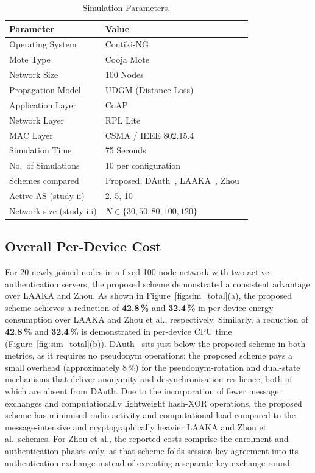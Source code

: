 \documentclass[12pt,a4paper]{report}
\begin{document}
\begin{table}[!ht]
  \centering
  \caption{Simulation Parameters.}
  \label{tab:simparams}
  \small
  \setlength{\tabcolsep}{5pt}
  \begin{tabular}{ll}
    \toprule
    Parameter & Value \\
    \midrule
    Operating System     & Contiki-NG \\
    Mote Type            & Cooja Mote \\
    Network Size         & 100 Nodes \\
    Propagation Model    & UDGM (Distance Loss) \\
    Application Layer    & CoAP \\
    Network Layer        & RPL Lite \\
    MAC Layer            & CSMA / IEEE 802.15.4 \\
    Simulation Time      & 75 Seconds \\
    No.\ of Simulations  & 10 per configuration \\
    Schemes compared     & Proposed, DAuth~\cite{das2026comsnets}, LAAKA~\cite{ali2024laaka}, Zhou~\cite{zhou2024auth} \\
    Active AS (study ii) & 2, 5, 10 \\
    Network size (study iii) & $N \in \{30, 50, 80, 100, 120\}$ \\
    \bottomrule
  \end{tabular}
\end{table}

\subsection{Overall Per-Device Cost}

For 20 newly joined nodes in a fixed 100-node network with two active authentication
servers, the proposed scheme demonstrated a consistent advantage over LAAKA and Zhou.
As shown in Figure~\ref{fig:sim_total}(a), the proposed scheme achieves a reduction
of \textbf{42.8\,\%} and \textbf{32.4\,\%} in per-device energy consumption
over LAAKA and Zhou et al., respectively.
Similarly, a reduction of \textbf{42.8\,\%} and \textbf{32.4\,\%} is demonstrated
in per-device CPU time (Figure~\ref{fig:sim_total}(b)).
DAuth~\cite{das2026comsnets} sits just below the proposed scheme in both metrics,
as it requires no pseudonym operations; the proposed scheme pays a small overhead
(approximately 8\,\%) for the pseudonym-rotation and dual-state mechanisms that
deliver anonymity and desynchronisation resilience, both of which are absent from DAuth.
Due to the incorporation of fewer message exchanges and computationally lightweight
hash-XOR operations, the proposed scheme has minimised radio activity and
computational load compared to the message-intensive and cryptographically heavier
LAAKA and Zhou et al.\ schemes.
For Zhou et al., the reported costs comprise the enrolment and authentication phases
only, as that scheme folds session-key agreement into its authentication exchange
instead of executing a separate key-exchange round.
\end{document}
